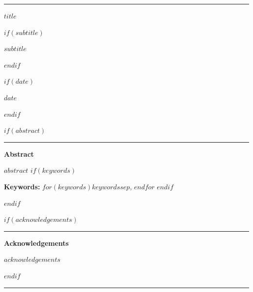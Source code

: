 \documentclass[12pt]{article}
\newif\ifhfwganon
\begin{document}
\begin{titlepage}
\thispagestyle{empty}
\noindent\textcolor{hfwgaccent}{\rule{\textwidth}{3pt}}\par
\vspace*{0.13\textheight}
\begin{center}
\begin{singlespace}

{\LARGE\bfseries $title$\par}

$if(subtitle)$
\vspace{0.5em}
{\large\color{hfwgaccent} $subtitle$\par}
$endif$

\vspace{2em}

\hfwgauthorblock

\par\vspace{2\baselineskip}
\hfwgseriesblock

$if(date)$
\ifhfwganon\else
\vspace{0.25em}
{\small $date$}\par
\fi
$endif$

\end{singlespace}
\end{center}

\vspace{2em}

$if(abstract)$
\begin{center}
\textcolor{hfwgrule}{\rule{0.35\textwidth}{0.5pt}}\par
\vspace{0.5em}
\begin{minipage}{0.9\linewidth}
\small\singlespacing
\textbf{Abstract}\par\vspace{0.25em}
$abstract$
$if(keywords)$
\par\vspace{0.75em}
\noindent\textbf{Keywords: }$for(keywords)$$keywords$$sep$, $endfor$
$endif$
\end{minipage}
\end{center}
\vspace{1em}
$endif$

$if(acknowledgements)$
\ifhfwganon\else
\begin{center}
\begin{minipage}{0.9\linewidth}
\footnotesize\singlespacing
\noindent\textcolor{hfwgaccent}{\rule{0.25\textwidth}{0.4pt}}\par
\textbf{Acknowledgements}\par
$acknowledgements$
\end{minipage}
\end{center}
\vspace{1em}
\fi
$endif$

\vfill

\noindent\textcolor{hfwgaccent}{\rule{\textwidth}{2pt}}\par
\end{titlepage}
\end{document}
